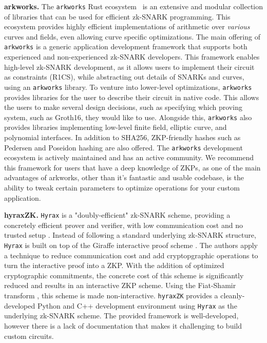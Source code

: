 \textbf{arkworks.} The \texttt{arkworks} Rust ecosystem~\cite{arkworks} is an extensive and modular collection of libraries that can be used for efficient zk-SNARK programming. This ecosystem provides highly efficient implementations of arithmetic over \textit{various} curves and fields, even allowing curve specific optimizations. The main offering of \texttt{arkworks} is a generic application development framework that supports both experienced and non-experienced zk-SNARK developers. This framework enables high-level zk-SNARK development, as it allows users to implement their circuit as constraints (R1CS), while abstracting out details of SNARKs and curves, using an \texttt{arkworks} library. To venture into lower-level optimizations, \texttt{arkworks} provides libraries for the user to describe their circuit in native code. This allows the users to make several design decisions, such as specifying which proving system, such as Groth16, they would like to use. Alongside this, \texttt{arkworks} also provides libraries implementing low-level finite field, elliptic curve, and polynomial interfaces. In addition to SHA256, ZKP-friendly hashes such as Pedersen \cite{pedersenhash} and Poseidon \cite{poseidonhash} hashing are also offered. The \texttt{arkworks} development ecosystem is actively maintained and has an active community. We recommend this framework for users that have a deep knowledge of ZKPs, as one of the main advantages of arkworks, other than it's fantastic and usable codebase, is the ability to tweak certain parameters to optimize operations for your custom application.

\textbf{hyraxZK.} \label{sec:hyrax} \texttt{Hyrax} is a "doubly-efficient" zk-SNARK scheme, providing a concretely efficient prover and verifier, with low communication cost and no trusted setup \cite{wahby2018doubly}. Instead of following a standard underlying zk-SNARK structure, \texttt{Hyrax} is built on top of the Giraffe interactive proof scheme \cite{wahby2017full}. The authors apply a technique to reduce communication cost and add cryptopgraphic operations to turn the interactive proof into a ZKP. With the addition of optimized cryptographic commitments, the concrete cost of this scheme is significantly reduced and results in an interactive ZKP scheme. Using the Fiat-Shamir transform \cite{kilian1992note}, this scheme is made non-interactive. \texttt{hyraxZK} \cite{hyraxZK} provides a cleanly-developed Python and C++ development environment using \texttt{Hyrax} as the underlying zk-SNARK scheme. The provided framework is well-developed, however there is a lack of documentation that makes it challenging to build custom circuits.

